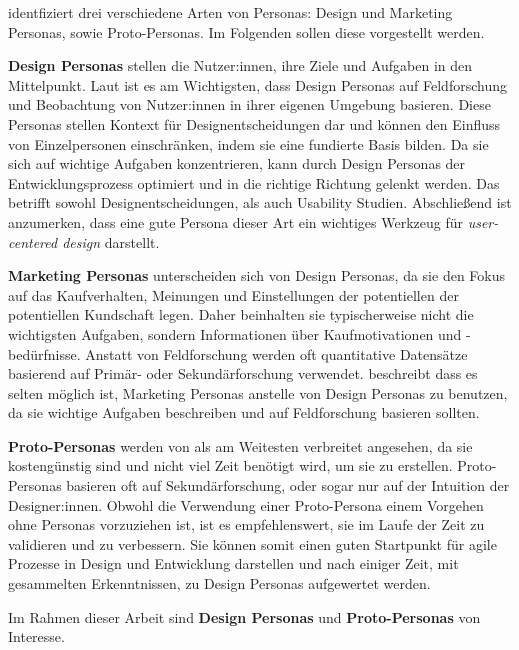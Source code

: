 \textcite{tomlinUXOptimization2018} identfiziert drei verschiedene Arten von Personas: Design und
Marketing Personas, sowie Proto-Personas. Im Folgenden sollen diese vorgestellt werden.

\textbf{Design Personas} stellen die Nutzer:innen, ihre Ziele und Aufgaben in den Mittelpunkt. Laut
\textcite{tomlinUXOptimization2018} ist es am Wichtigsten, dass Design Personas auf Feldforschung
und Beobachtung von Nutzer:innen in ihrer eigenen Umgebung basieren. Diese Personas stellen Kontext
für Designentscheidungen dar und können den Einfluss von Einzelpersonen einschränken, indem sie eine
fundierte Basis bilden.  Da sie sich auf wichtige Aufgaben konzentrieren, kann
durch Design Personas der Entwicklungsprozess optimiert und in die richtige Richtung gelenkt werden.
Das betrifft sowohl Designentscheidungen, als auch Usability Studien. Abschließend ist anzumerken,
dass eine gute Persona dieser Art ein wichtiges Werkzeug für \textit{user-centered design}
darstellt.
\parencite{tomlinUXOptimization2018}

\textbf{Marketing Personas} unterscheiden sich von Design Personas, da sie den Fokus auf das
Kaufverhalten, Meinungen und Einstellungen der potentiellen der potentiellen Kundschaft legen. Daher
beinhalten sie typischerweise nicht die wichtigsten Aufgaben, sondern Informationen über
Kaufmotivationen und -bedürfnisse. Anstatt von Feldforschung werden oft quantitative Datensätze
basierend auf Primär- oder Sekundärforschung verwendet. \textcite{tomlinUXOptimization2018}
beschreibt dass es selten möglich ist, Marketing Personas anstelle von Design Personas zu benutzen,
da sie wichtige Aufgaben beschreiben und auf Feldforschung basieren sollten.
\parencite{tomlinUXOptimization2018}

\textbf{Proto-Personas} werden von \textcite{tomlinUXOptimization2018} als am Weitesten verbreitet
angesehen, da sie kostengünstig sind und nicht viel Zeit benötigt wird, um sie zu erstellen.
Proto-Personas basieren oft auf Sekundärforschung, oder sogar nur auf der Intuition der
Designer:innen. Obwohl die Verwendung einer Proto-Persona einem Vorgehen ohne Personas vorzuziehen
ist, ist es empfehlenswert, sie im Laufe der Zeit zu validieren und zu verbessern. Sie können somit
einen guten Startpunkt für agile Prozesse in Design und Entwicklung darstellen und nach einiger
Zeit, mit gesammelten Erkenntnissen, zu Design Personas aufgewertet werden.
\parencite{tomlinUXOptimization2018}

Im Rahmen dieser Arbeit sind \textbf{Design Personas} und \textbf{Proto-Personas} von Interesse.

